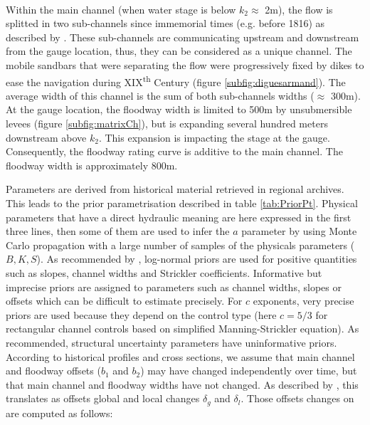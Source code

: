 \documentclass[11pt]{article}
\begin{document}
        \paragraph{}
        Within the main channel (when water stage is below $k_2 \approx$ 2m), the flow is splitted in two sub-channels since immemorial times (e.g. before 1816) as described by \citet{armand_ii_1907}. These sub-channels are communicating upstream and downstream from the gauge location, thus, they can be considered as a unique channel. The mobile sandbars that were separating the flow were progressively fixed by dikes to ease the navigation during XIX\textsuperscript{th} Century (figure \ref{subfig:diguesarmand}). The average width of this channel is the sum of both sub-channels widths ($\approx$ 300m).  
        At the gauge location, the floodway width is limited to 500m by unsubmersible levees  (figure \ref{subfig:matrixCh}), but is expanding several hundred meters downstream above $k_2$. This expansion is impacting the stage at the gauge. Consequently, the floodway rating curve is additive to the main channel. The floodway width is approximately 800m. 

       Parameters are derived from historical material retrieved in regional archives. This leads to the prior parametrisation described in table \ref{tab:PriorPt}. Physical parameters that have a direct hydraulic meaning are here expressed in the first three lines, then some of them are used to infer the $a$ parameter by using Monte Carlo propagation with a large number of samples of the physicals parameters ($B,K,S$). As recommended by \citet{le_coz_combining_2014}, log-normal priors are used for positive quantities such as slopes, channel widths and Strickler coefficients. Informative but imprecise priors are assigned to parameters such as channel widths, slopes or offsets which can be difficult to estimate precisely. For $c$ exponents, very precise priors are used because they depend on the control type (here $c=5/3$ for rectangular channel controls based on simplified Manning-Strickler equation). As recommended, structural uncertainty parameters have uninformative priors. According to historical profiles and cross sections, we assume that main channel and floodway offsets ($b_1$ and $b_2$) may have changed independently over time, but that main channel and floodway widths have not changed. As described by \citet{mansanarez_shift_2019}, this translates as offsets global and local changes $\delta_g$ and $\delta_l$. Those offsets changes on are computed as follows:
       
\end{document}
